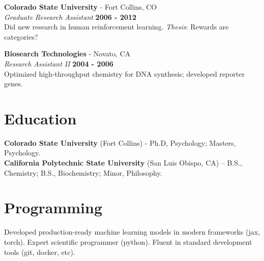 \documentclass[margin,line]{res}
\begin{document}
\begin{resume}
\vspace{-.25cm}
{\bf Colorado State University} - Fort Collins, CO\\
{\em Graduate Research Assistant} \hfill {\bf 2006 - 2012}\\
Did new research in human reinforcement learning. \emph{Thesis}: Rewards are categories?

\vspace{-.25cm}
{\bf Biosearch Technologies} - Novato, CA\\
{\em Research Assistant II} \hfill {\bf 2004 - 2006}\\
Optimized high-throughput chemistry for DNA synthesis; developed reporter genes.

\vspace{-.25cm}
\section{\sc Education}
{\bf Colorado State University} (Fort Collins) - Ph.D, Psychology; Masters, Psychology.\\

\vspace*{-.3in}
{\bf California Polytechnic State University} (San Luis Obispo, CA) -- B.S., Chemistry; B.S., Biochemistry; Minor, Philosophy.\\

\vspace{-.8cm}
\section{\sc Programming} Developed production-ready machine learning models in modern frameworks (jax, torch). Expert scientific programmer (python). Fluent in standard development tools (git, docker, etc).

    

\end{resume}
\end{document}

